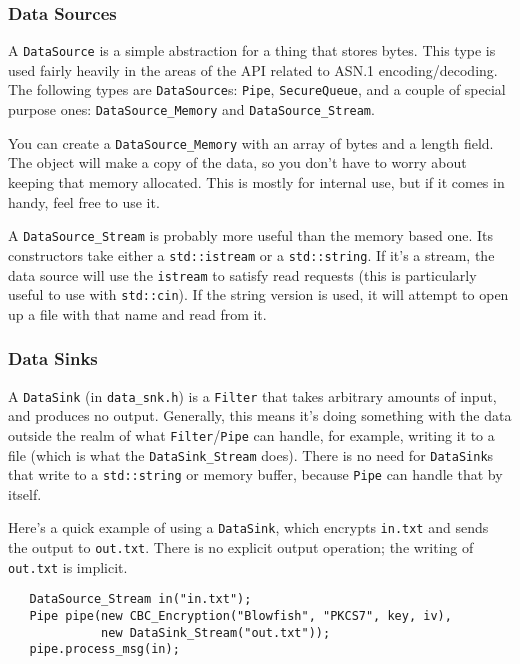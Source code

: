 \documentclass{article}
\newcommand{\filename}[1]{\texttt{#1}}
\newcommand{\type}[1]{\texttt{#1}}
\begin{document}
\subsubsection{Data Sources}

A \type{DataSource} is a simple abstraction for a thing that stores bytes. This
type is used fairly heavily in the areas of the API related to ASN.1
encoding/decoding. The following types are \type{DataSource}s: \type{Pipe},
\type{SecureQueue}, and a couple of special purpose ones:
\type{DataSource\_Memory} and \type{DataSource\_Stream}.

You can create a \type{DataSource\_Memory} with an array of bytes and a length
field. The object will make a copy of the data, so you don't have to worry
about keeping that memory allocated. This is mostly for internal use, but if it
comes in handy, feel free to use it.

A \type{DataSource\_Stream} is probably more useful than the memory based
one. Its constructors take either a \type{std::istream} or a
\type{std::string}. If it's a stream, the data source will use the
\type{istream} to satisfy read requests (this is particularly useful to use
with \type{std::cin}). If the string version is used, it will attempt to open
up a file with that name and read from it.

\subsubsection{Data Sinks}

A \type{DataSink} (in \filename{data\_snk.h}) is a \type{Filter} that takes
arbitrary amounts of input, and produces no output. Generally, this means it's
doing something with the data outside the realm of what
\type{Filter}/\type{Pipe} can handle, for example, writing it to a file (which
is what the \type{DataSink\_Stream} does). There is no need for
\type{DataSink}s that write to a \type{std::string} or memory buffer, because
\type{Pipe} can handle that by itself.

Here's a quick example of using a \type{DataSink}, which encrypts
\filename{in.txt} and sends the output to \filename{out.txt}. There is
no explicit output operation; the writing of \filename{out.txt} is
implicit.

\begin{verbatim}
   DataSource_Stream in("in.txt");
   Pipe pipe(new CBC_Encryption("Blowfish", "PKCS7", key, iv),
             new DataSink_Stream("out.txt"));
   pipe.process_msg(in);
\end{verbatim}
\end{document}
